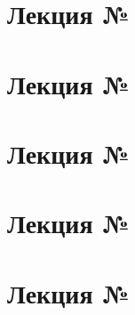 
% 




\section{Лекция № \thesection}


\section{Лекция № \thesection}


\section{Лекция № \thesection}


\section{Лекция № \thesection}


\section{Лекция № \thesection}
